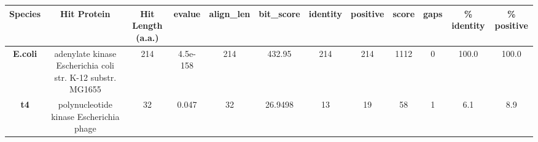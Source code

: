 \begin{tabular}{|c|c|c|c|c|c|c|c|c|c|c|c|} \hline
\textbf{Species} & \textbf{Hit Protein} & \textbf{Hit Length (a.a.)} & \textbf{evalue} & \textbf{align\_len} & \textbf{bit\_score} & \textbf{identity} & \textbf{positive} & \textbf{score} & \textbf{gaps} & \textbf{\% identity} & \textbf{\% positive} \\ \hline
\textbf{E.coli} & adenylate kinase Escherichia coli str. K-12 substr. MG1655 & 214 & 4.5e-158 & 214 & 432.95 & 214 & 214 & 1112 & 0 & 100.0 & 100.0\\
\textbf{t4} & polynucleotide kinase Escherichia phage  & 32 & 0.047 & 32 & 26.9498 & 13 & 19 & 58 & 1 & 6.1 & 8.9\\
\hline \end{tabular}
